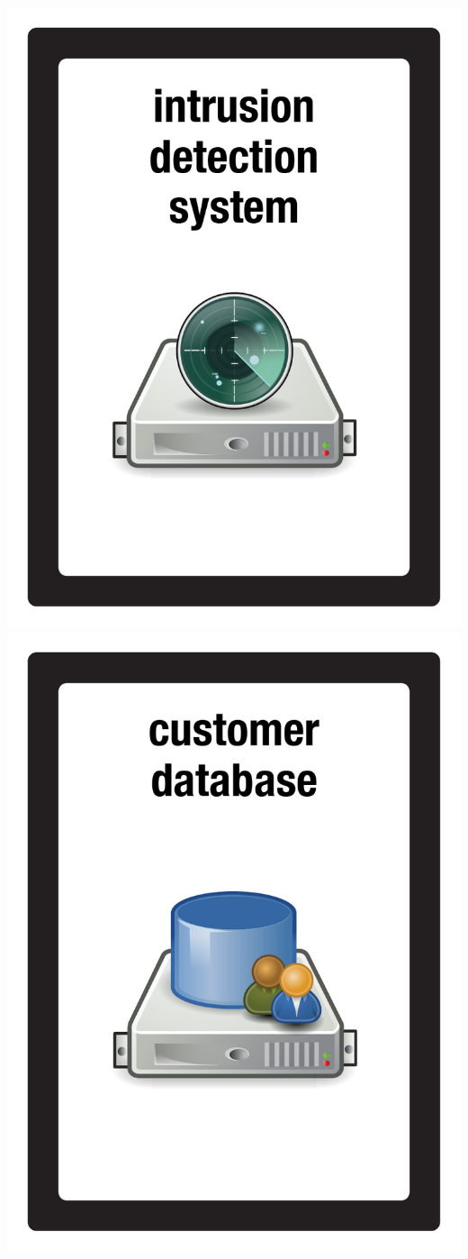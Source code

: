 \documentclass{letter}
\begin{document}
\includegraphics{patch/patch_intusion_sys}
\includegraphics{patch/patch_customer_db}
\end{document}
